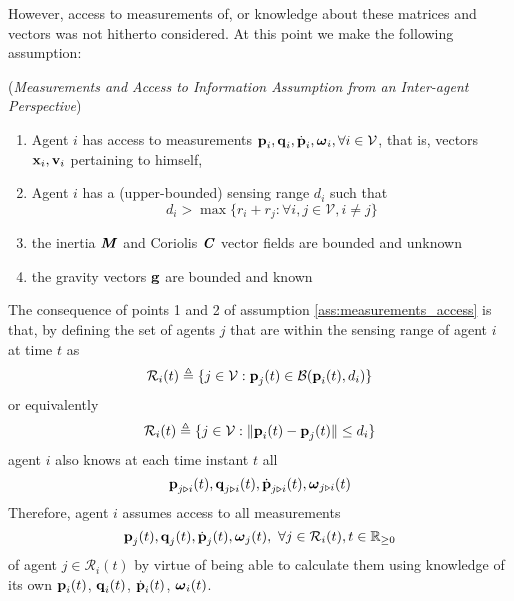 However, access to measurements of, or knowledge about these matrices and
vectors was not hitherto considered. At this point we make the following
assumption:

\begin{gg_box}
  \begin{assumption} (\textit{Measurements and Access to Information Assumption
    from an Inter-agent Perspective})
  \begin{enumerate}

    \item Agent $i$ has access to measurements
      $\bm{\mathbf{p}}_i, \bm{\mathbf{q}}_i, \dot{\bm{\mathbf{p}}}_i, \bm{\mathbf{\omega}}_i, \forall i\in\mathcal{V}$,
      that is, vectors $\bm{\mathbf{x}}_i, \bm{\mathbf{v}}_i$ pertaining to himself,

    \item Agent $i$ has a (upper-bounded) sensing range $d_i$ such that
      $$d_i > \max\{r_i + r_j : \forall i,j \in \mathcal{V}, i \neq j\}$$

    \item the inertia $\bm{\mathit{M}}$ and Coriolis $\bm{\mathit{C}}$ vector fields are
      bounded and unknown

    \item the gravity vectors $\bm{\mathbf{g}}$ are bounded and known

  \end{enumerate}
  \label{ass:measurements_access}
\end{assumption}
\end{gg_box}

The consequence of points 1 and 2 of assumption \eqref{ass:measurements_access}
is that, by defining the set of agents $j$ that are within the sensing range
of agent $i$ at time $t$ as
$$\mathcal{R}_i(t) \triangleq \{j\in\mathcal{V} : \bm{\mathbf{p}}_j(t)\in\mathcal{B}(\bm{\mathbf{p}}_i(t), d_i)\}$$
or equivalently
$$\mathcal{R}_i(t) \triangleq \{j\in\mathcal{V} : \| \bm{\mathbf{p}}_i(t) - \bm{\mathbf{p}}_j(t) \| \leq d_i\}$$
agent $i$ also knows at each time instant $t$ all
$$\bm{\mathbf{p}}_{j \triangleright i}(t), \bm{\mathbf{q}}_{j \triangleright i}(t),
\dot{\bm{\mathbf{p}}}_{j \triangleright i}(t), \bm{\mathbf{\omega}}_{j \triangleright i}(t)$$
Therefore, agent $i$ assumes access to all measurements
$$\bm{\mathbf{p}}_{j}(t), \bm{\mathbf{q}}_{j}(t), \dot{\bm{\mathbf{p}}}_j(t),
\bm{\mathbf{\omega}}_j(t),\ \forall j\in \mathcal{R}_i(t),t\in\mathbb{R}_{\geq 0}$$
of agent $j \in \mathcal{R}_i(t)$ by virtue of being able to calculate
them using knowledge of its own
$\bm{\mathbf{p}}_i(t)$, $\bm{\mathbf{q}}_i(t)$, $\dot{\bm{\mathbf{p}}}_i(t)$, $\bm{\mathbf{\omega}}_i(t)$.


